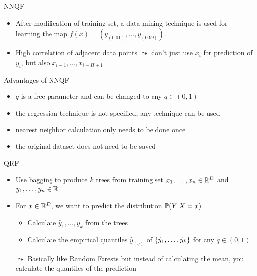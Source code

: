 \documentclass[10pt,aspectratio=169]{beamer}
\begin{document}
\begin{frame}{NNQF}
    \begin{itemize}
        \item After modification of training set, a data mining technique is used for learning the map \(f(x) = (y_{(0.01)}, \ldots, y_{(0.99)})\).
        \item High correlation of adjacent data points \(\leadsto\) don't just use \(x_i\) for prediction of \(y_i\), but also 
        \(x_{i-1}, \ldots, x_{i-H+1}\)
    \end{itemize}
\end{frame}

\begin{frame}{Advantages of NNQF}
    \begin{itemize}
        \item \(q\) is a free parameter and can be changed to any \(q\in (0,1)\)
        \item the regression technique is not specified, any technique can be used
        \item nearest neighbor calculation only needs to be done once
        \item the original dataset does not need to be saved
    \end{itemize}
\end{frame}

\begin{frame}{QRF}
    \begin{itemize}
        \item Use bagging to produce \(k\) trees from training set \(x_1, \ldots, x_n \in \R^D\) and \(y_1, \ldots, y_n \in \R\)
        \item For \(x\in \R^D\), we want to predict the distribution \(\P(Y | X=x)\)
        \begin{itemize}
            \item Calculate \(\hat{y}_1, \ldots, \hat{y}_k\) from the trees 
            \item Calculate the empirical quantiles \(\hat{y}_{(q)}\) of \(\set{\hat{y}_1, \ldots, \hat{y}_k}\) for any \(q \in (0,1)\)
        \end{itemize}
        \item[\(\leadsto\)] Basically like Random Forests but instead of calculating the mean, you calculate the quantiles of the prediction
    \end{itemize}
\end{frame}
\end{document}
